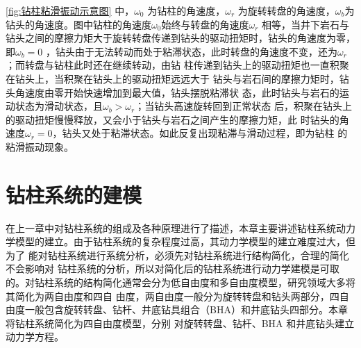 \documentclass[12pt,hyperref,a4paper,UTF8]{ctexart}
\begin{document}
	
	\autoref{fig:钻柱粘滑振动示意图} 中，$\omega _0$ 为钻柱的角速度，${\omega _r}$ 为旋转转盘的角速度，${\omega _b}$为钻头的角速度。图中钻柱的角速度${\omega_0}$始终与转盘的角速度${\omega _r}$ 相等，当井下岩石与钻头之间的摩擦力矩大于旋转转盘传递到钻头的驱动扭矩时，钻头的角速度为零，即${\omega _b}=0$ ，钻头由于无法转动而处于粘滞状态，此时转盘的角速度不变，还为${\omega _r}$；而转盘与钻柱此时还在继续转动，由钻 柱传递到钻头上的驱动扭矩也一直积聚在钻头上，当积聚在钻头上的驱动扭矩远远大于 钻头与岩石间的摩擦力矩时，钻头角速度由零开始快速增加到最大值，钻头摆脱粘滞状 态，此时钻头与岩石的运动状态为滑动状态，且${\omega _b} > {\omega _r}$；当钻头高速旋转回到正常状态 后，积聚在钻头上的驱动扭矩慢慢释放，又会小于钻头与岩石之间产生的摩擦力矩，此 时钻头的角速度${\omega _r}=0$，钻头又处于粘滞状态。如此反复出现粘滞与滑动过程，即为钻柱 的粘滑振动现象。
	
	
	

	
	\section{钻柱系统的建模}
	在上一章中对钻柱系统的组成及各种原理进行了描述，本章主要讲述钻柱系统动力 学模型的建立。由于钻柱系统的复杂程度过高，其动力学模型的建立难度过大，但为了 能对钻柱系统进行系统分析，必须先对钻柱系统进行结构简化，合理的简化不会影响对 钻柱系统的分析，所以对简化后的钻柱系统进行动力学建模是可取的。对钻柱系统的结构简化通常会分为低自由度和多自由度模型，研究领域大多将其简化为两自由度和四自 由度，两自由度一般分为旋转转盘和钻头两部分，四自由度一般包含旋转转盘、钻杆、井底钻具组合（BHA）和井底钻头四部分。本章将钻柱系统简化为四自由度模型，分别 对旋转转盘、钻杆、BHA 和井底钻头建立动力学方程。
\end{document}
